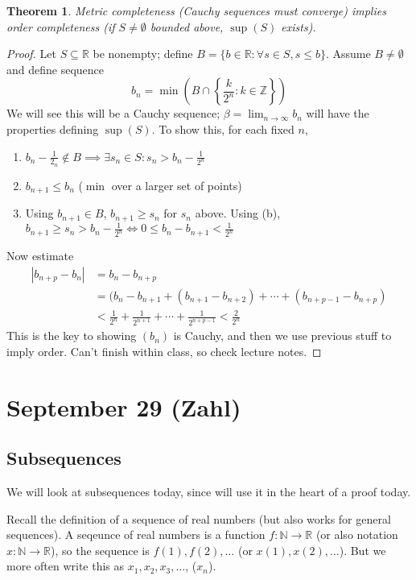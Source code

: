 \documentclass{article}
\theoremstyle{plain}
\newtheorem{theorem}{Theorem}
\theoremstyle{remark}
\newcommand{\N}{{\mathbb N}}
\newcommand{\Z}{{\mathbb Z}}
\newcommand{\R}{{\mathbb R}}
\begin{document}
\begin{theorem}
	Metric completeness (Cauchy sequences must converge)
	implies order completeness (if $S \neq \emptyset$ bounded above, $\sup(S)$ exists).
\end{theorem}
\begin{proof}
	Let $S \subseteq \R$ be nonempty;
	define $B = \{ b \in \R \colon \forall s \in S, s \leq b\}$.
	Assume $B \neq \emptyset$ and define sequence
	\[
		b_n = \min\left(B \cap \left\{\frac{k}{2^n} \colon k \in \Z\right\}\right)
	\]
	We will see this will be a Cauchy sequence;
	$\beta = \lim_{n\to\infty} b_n$ will have the properties defining $\sup(S)$.
	To show this, for each fixed $n$,
	\begin{enumerate}
		\item $b_n - \frac{1}{2_n} \not \in B \implies
			\exists s_n \in S \colon s_n > b_n - \frac{1}{2^n}$
		\item $b_{n+1} \leq b_n$ ($\min$ over a larger set of points)
		\item Using $b_{n+1} \in B$, $b_{n+1} \geq s_n$ for $s_n$ above.
			Using (b), $b_{n+1} \geq s_n > b_n - \frac{1}{2^n}
			\iff 0 \leq b_n - b_{n+1} < \frac{1}{2^n}$
	\end{enumerate}
	Now estimate
	\begin{align*}
		|b_{n+p} - b_n|
		&= b_n - b_{n+p}\\
		&= (b_n - b_{n+1} + (b_{n+1} - b_{n+2}) + \cdots + (b_{n+p-1} - b_{n+p})\\
		&< \frac{1}{2^n} + \frac{1}{2^{n+1}} + \cdots +\frac{1}{2^{n+p-1}} < \frac{2}{2^n}
	\end{align*}
	This is the key to showing $(b_n)$ is Cauchy,
	and then we use previous stuff to imply order.
	Can't finish within class, so check lecture notes.
\end{proof}

\section{September 29 (Zahl)}
\subsection{Subsequences}
We will look at subsequences today,
since will use it in the heart of a proof today.

Recall the definition of a sequence of real numbers
(but also works for general sequences).
A seqeunce of real numbers is a function $f \colon \N \to \R$
(or also notation $x\colon \N \to \R$),
so the sequence is $f(1),f(2),\dots$ (or $x(1), x(2),\dots$).
But we more often write this as $x_1,x_2,x_3,\dots$, ($x_n$).
\end{document}
